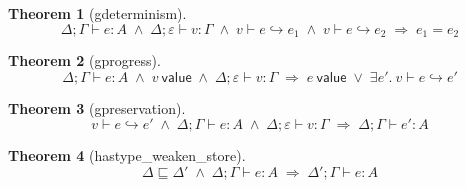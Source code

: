 \documentclass[10pt]{article}
\newtheorem{theorem}{Theorem}[section]
\newcommand{\tp}{\varepsilon}
\newcommand{\Val}{\mathsf{value}}
\newcommand{\step}[3]{#1 \vdash #2 \hookrightarrow #3}
\newcommand{\hast}[4]{#1; #2 \vdash #3 : #4}
\newcommand{\storele}{\sqsubseteq}
\begin{document}
\begin{theorem}[\textsf{gdeterminism}]
\[
\hast{\Delta}{\Gamma}{e}{A} \;\wedge\; \hast{\Delta}{\tp}{v}{\Gamma} \;\wedge\;
\step{v}{e}{e_1} \;\wedge\; \step{v}{e}{e_2} \;\Longrightarrow\; e_1 = e_2
\]
\end{theorem}

\begin{theorem}[\textsf{gprogress}]
\[
\hast{\Delta}{\Gamma}{e}{A} \;\wedge\; v\ \Val \;\wedge\; \hast{\Delta}{\tp}{v}{\Gamma}
\;\Longrightarrow\; e\ \Val \;\vee\; \exists e'.\ \step{v}{e}{e'}
\]
\end{theorem}

\begin{theorem}[\textsf{gpreservation}]
\[
\step{v}{e}{e'} \;\wedge\; \hast{\Delta}{\Gamma}{e}{A} \;\wedge\; \hast{\Delta}{\tp}{v}{\Gamma}
\;\Longrightarrow\; \hast{\Delta}{\Gamma}{e'}{A}
\]
\end{theorem}

\begin{theorem}[\textsf{hastype\_weaken\_store}]
\[
\Delta \storele \Delta' \;\wedge\; \hast{\Delta}{\Gamma}{e}{A} \;\Longrightarrow\; \hast{\Delta'}{\Gamma}{e}{A}
\]
\end{theorem}
\end{document}
